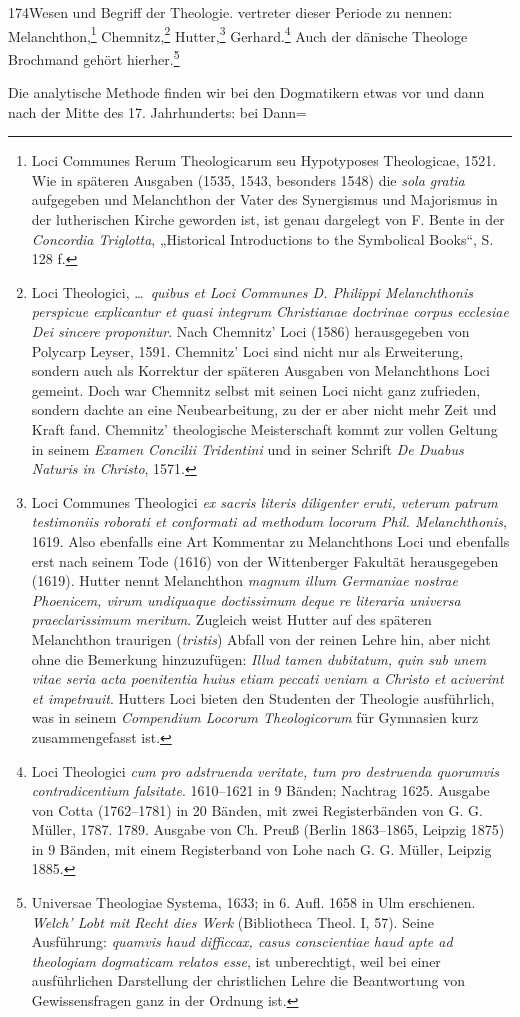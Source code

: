 \textnormal{174}\hfill\textnormal{Wesen und Begriff der Theologie.} vertreter dieser Periode zu nennen: Melanchthon,\footnote{Loci Communes Rerum Theologicarum seu Hypotyposes Theologicae, 1521. Wie in späteren Ausgaben (1535, 1543, besonders 1548) die \emph{sola gratia} aufgegeben und Melanchthon der Vater des Synergismus und Majorismus in der lutherischen Kirche geworden ist, ist genau dargelegt von F. Bente in der \emph{Concordia Triglotta}, „Historical Introductions to the Symbolical Books“, S. 128 f.} Chemnitz,\footnote{Loci Theologici, \ldots\ \emph{quibus et Loci Communes D. Philippi Melanchthonis perspicue explicantur et quasi integrum Christianae doctrinae corpus ecclesiae Dei sincere proponitur}. Nach Chemnitz' Loci (1586) herausgegeben von Polycarp Leyser, 1591. Chemnitz' Loci sind nicht nur als Erweiterung, sondern auch als Korrektur der späteren Ausgaben von Melanchthons Loci gemeint. Doch war Chemnitz selbst mit seinen Loci nicht ganz zufrieden, sondern dachte an eine Neubearbeitung, zu der er aber nicht mehr Zeit und Kraft fand. Chemnitz' theologische Meisterschaft kommt zur vollen Geltung in seinem \emph{Examen Concilii Tridentini} und in seiner Schrift \emph{De Duabus Naturis in Christo}, 1571.} Hutter,\footnote{Loci Communes Theologici \emph{ex sacris literis diligenter eruti, veterum patrum testimoniis roborati et conformati ad methodum locorum Phil. Melanchthonis}, 1619. Also ebenfalls eine Art Kommentar zu Melanchthons Loci und ebenfalls erst nach seinem Tode (1616) von der Wittenberger Fakultät herausgegeben (1619). Hutter nennt Melanchthon \emph{magnum illum Germaniae nostrae Phoenicem, virum undiquaque doctissimum deque re literaria universa praeclarissimum meritum}. Zugleich weist Hutter auf des späteren Melanchthon traurigen (\emph{tristis}) Abfall von der reinen Lehre hin, aber nicht ohne die Bemerkung hinzuzufügen: \emph{Illud tamen dubitatum, quin sub unem vitae seria acta poenitentia huius etiam peccati veniam a Christo et aciverint et impetrauit}. Hutters Loci bieten den Studenten der Theologie ausführlich, was in seinem \emph{Compendium Locorum Theologicorum} für Gymnasien kurz zusammengefasst ist.} Gerhard.\footnote{Loci Theologici \emph{cum pro adstruenda veritate, tum pro destruenda quorumvis contradicentium falsitate}. 1610--1621 in 9 Bänden; Nachtrag 1625. Ausgabe von Cotta (1762--1781) in 20 Bänden, mit zwei Registerbänden von G. G. Müller, 1787. 1789. Ausgabe von Ch. Preuß (Berlin 1863--1865, Leipzig 1875) in 9 Bänden, mit einem Registerband von Lohe nach G. G. Müller, Leipzig 1885.} Auch der dänische Theologe Brochmand gehört hierher.\footnote{Universae Theologiae Systema, 1633; in 6. Aufl. 1658 in Ulm erschienen. \emph{Welch' Lobt mit Recht dies Werk} (Bibliotheca Theol. I, 57). Seine Ausführung: \emph{quamvis haud difficcax, casus conscientiae haud apte ad theologiam dogmaticam relatos esse}, ist unberechtigt, weil bei einer ausführlichen Darstellung der christlichen Lehre die Beantwortung von Gewissensfragen ganz in der Ordnung ist.}\par Die analytische Methode finden wir bei den Dogmatikern etwas vor und dann nach der Mitte des 17. Jahrhunderts: bei Dann=